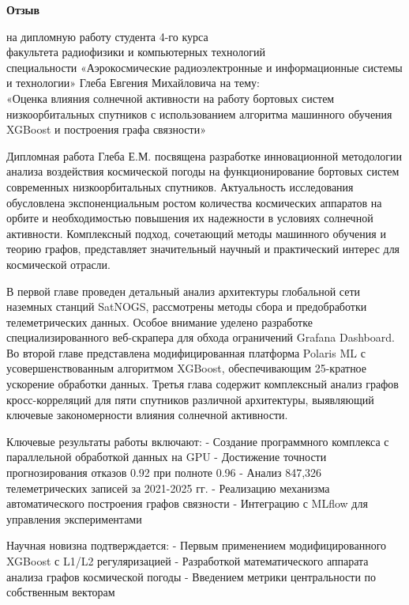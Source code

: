 \documentclass[14pt, a4paper]{bsu_review}
\begin{document}
\begin{center}
\textbf{Отзыв}
\end{center}

\begin{center}
\noindent на дипломную работу студента 4-го курса\\
факультета радиофизики и компьютерных технологий\\
специальности «Аэрокосмические радиоэлектронные и информационные системы и технологии» Глеба Евгения Михайловича на тему:\\
«Оценка влияния солнечной активности на работу бортовых систем низкоорбитальных спутников с использованием алгоритма машинного обучения XGBoost и построения графа связности»
\end{center}

Дипломная работа Глеба Е.М. посвящена разработке инновационной методологии анализа воздействия космической погоды на функционирование бортовых систем современных низкоорбитальных спутников. Актуальность исследования обусловлена экспоненциальным ростом количества космических аппаратов на орбите и необходимостью повышения их надежности в условиях солнечной активности. Комплексный подход, сочетающий методы машинного обучения и теорию графов, представляет значительный научный и практический интерес для космической отрасли.

В первой главе проведен детальный анализ архитектуры глобальной сети наземных станций SatNOGS, рассмотрены методы сбора и предобработки телеметрических данных. Особое внимание уделено разработке специализированного веб-скрапера для обхода ограничений Grafana Dashboard. Во второй главе представлена модифицированная платформа Polaris ML с усовершенствованным алгоритмом XGBoost, обеспечивающим 25-кратное ускорение обработки данных. Третья глава содержит комплексный анализ графов кросс-корреляций для пяти спутников различной архитектуры, выявляющий ключевые закономерности влияния солнечной активности.

Ключевые результаты работы включают:
- Создание программного комплекса с параллельной обработкой данных на GPU
- Достижение точности прогнозирования отказов 0.92 при полноте 0.96
- Анализ 847,326 телеметрических записей за 2021-2025 гг.
- Реализацию механизма автоматического построения графов связности
- Интеграцию с MLflow для управления экспериментами

Научная новизна подтверждается:
- Первым применением модифицированного XGBoost с L1/L2 регуляризацией
- Разработкой математического аппарата анализа графов космической погоды
- Введением метрики центральности по собственным векторам
\end{document}
